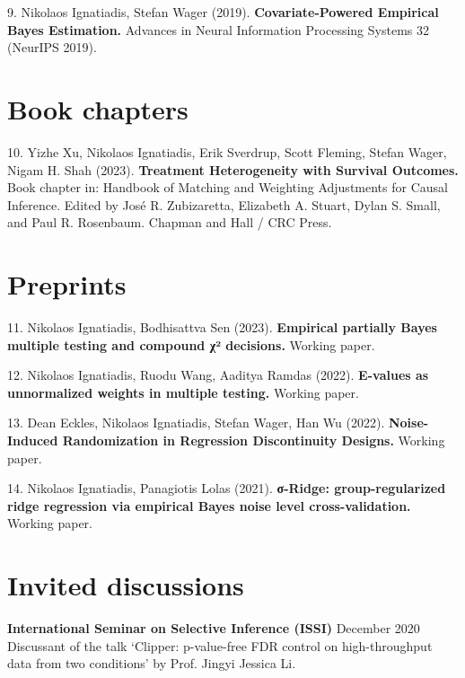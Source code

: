 \documentclass[margin,line]{res}
\newenvironment{list1}{
  \begin{list}{\ding{113}}{%
      \setlength{\itemsep}{0in}
      \setlength{\parsep}{0in} \setlength{\parskip}{0in}
      \setlength{\topsep}{0in} \setlength{\partopsep}{0in}
      \setlength{\leftmargin}{0.17in}}}{\end{list}}
\begin{document}
\begin{resume}
\begin{list1}
\item[9.]
Nikolaos Ignatiadis, Stefan Wager (2019).
\textbf{Covariate-Powered Empirical Bayes Estimation.}
Advances in Neural Information Processing Systems 32 (NeurIPS 2019).

\end{list1}

\section{\sc Book chapters}
\begin{list1}

\item[10.]
Yizhe Xu, Nikolaos Ignatiadis, Erik Sverdrup, Scott Fleming, Stefan Wager, Nigam H. Shah (2023).
\textbf{Treatment Heterogeneity with Survival Outcomes.}
Book chapter in: Handbook of Matching and Weighting Adjustments for Causal Inference. Edited by José R. Zubizaretta, Elizabeth A. Stuart, Dylan S. Small, and Paul R. Rosenbaum. Chapman and Hall / CRC Press.

\end{list1}

\section{\sc Preprints}
\begin{list1}

\item[11.]
Nikolaos Ignatiadis, Bodhisattva Sen (2023).
\textbf{Empirical partially Bayes multiple testing and compound χ² decisions.}
Working paper.

\item[12.]
Nikolaos Ignatiadis, Ruodu Wang, Aaditya Ramdas (2022).
\textbf{E-values as unnormalized weights in multiple testing.}
Working paper.

\item[13.]
Dean Eckles, Nikolaos Ignatiadis, Stefan Wager, Han Wu (2022).
\textbf{Noise-Induced Randomization in Regression Discontinuity Designs.}
Working paper.

\item[14.]
Nikolaos Ignatiadis, Panagiotis Lolas (2021).
\textbf{σ-Ridge: group-regularized ridge regression via empirical Bayes noise level cross-validation.}
Working paper.

\end{list1}


\section{\sc Invited discussions}
\textbf{International Seminar on Selective Inference (ISSI)} \hfill December 2020\\
Discussant of the talk `Clipper: p-value-free FDR control on high-throughput data from two conditions'
by Prof. Jingyi Jessica Li.




\end{resume}
\end{document}
